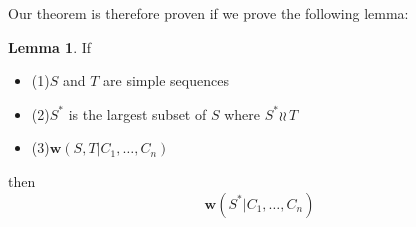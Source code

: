 \documentclass[12pt]{article}
\newcommand{\indep}{\wr\!\!\wr\,} %
\newcommand{\worksc}[2]{{\mathbf{w}}({#1}|{#2})}
\theoremstyle{definition}
\newtheorem{mylem}{Lemma}
\begin{document}
Our theorem is therefore proven if we prove the following lemma:

\begin{mylem}
If
   \begin{itemize}
   \item \newcommand{\condSimple}{(1)} \condSimple $S$ and $T$ are simple sequences
   \item \newcommand{\condApr}{(2)} \condApr $S^*$ is the largest subset of $S$ where $S^*\indep T$
   \item \newcommand{\condWork}{(3)} \condWork $\worksc{S,T}{C_1,\ldots,C_n}$
   \end{itemize}
then
\[ \worksc{S^*}{C_1,\ldots,C_n} \]
\end{mylem}
\end{document}
